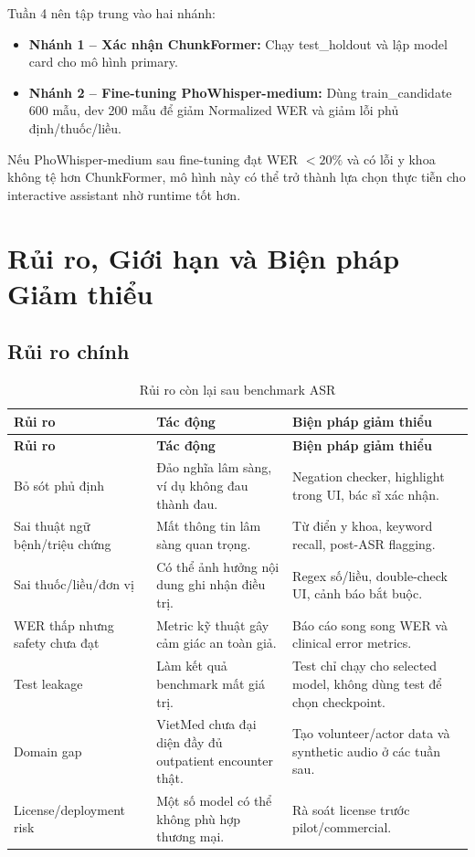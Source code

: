\documentclass[12pt,a4paper]{article}
\begin{document}
Tuần 4 nên tập trung vào hai nhánh:
\begin{itemize}[leftmargin=1.2cm]
    \item \textbf{Nhánh 1 -- Xác nhận ChunkFormer:} Chạy test\_holdout và lập model card cho mô hình primary.
    \item \textbf{Nhánh 2 -- Fine-tuning PhoWhisper-medium:} Dùng train\_candidate 600 mẫu, dev 200 mẫu để giảm Normalized WER và giảm lỗi phủ định/thuốc/liều.
\end{itemize}

Nếu PhoWhisper-medium sau fine-tuning đạt WER $<20\%$ và có lỗi y khoa không tệ hơn ChunkFormer, mô hình này có thể trở thành lựa chọn thực tiễn cho interactive assistant nhờ runtime tốt hơn.

\section{Rủi ro, Giới hạn và Biện pháp Giảm thiểu}

\subsection{Rủi ro chính}

\begin{longtable}{|p{3.5cm}|p{4.2cm}|p{6cm}|}
\caption{Rủi ro còn lại sau benchmark ASR}\\
\hline
\textbf{Rủi ro} & \textbf{Tác động} & \textbf{Biện pháp giảm thiểu} \\
\hline
\endfirsthead

\hline
\textbf{Rủi ro} & \textbf{Tác động} & \textbf{Biện pháp giảm thiểu} \\
\hline
\endhead

Bỏ sót phủ định & Đảo nghĩa lâm sàng, ví dụ không đau thành đau. & Negation checker, highlight trong UI, bác sĩ xác nhận. \\
\hline
Sai thuật ngữ bệnh/triệu chứng & Mất thông tin lâm sàng quan trọng. & Từ điển y khoa, keyword recall, post-ASR flagging. \\
\hline
Sai thuốc/liều/đơn vị & Có thể ảnh hưởng nội dung ghi nhận điều trị. & Regex số/liều, double-check UI, cảnh báo bắt buộc. \\
\hline
WER thấp nhưng safety chưa đạt & Metric kỹ thuật gây cảm giác an toàn giả. & Báo cáo song song WER và clinical error metrics. \\
\hline
Test leakage & Làm kết quả benchmark mất giá trị. & Test chỉ chạy cho selected model, không dùng test để chọn checkpoint. \\
\hline
Domain gap & VietMed chưa đại diện đầy đủ outpatient encounter thật. & Tạo volunteer/actor data và synthetic audio ở các tuần sau. \\
\hline
License/deployment risk & Một số model có thể không phù hợp thương mại. & Rà soát license trước pilot/commercial. \\
\hline
\end{longtable}
\end{document}
